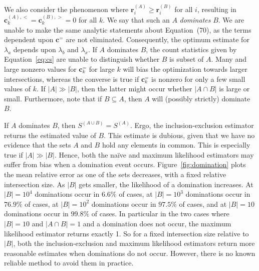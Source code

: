 \documentclass{vldb}
\begin{document}
\begin{appendix}
We also consider the phenomenon where $\mathbf{r}^{(A)}_i \geq \mathbf{r}^{(B)}_i$ for all $i$, resulting in  $\mathbf{c}^{(A),<}_k = \mathbf{c}^{(B),>}_k = 0$ for all $k$. 
We say that such an $A$ \emph{dominates} $B$. 
We are unable to make the same analytic statements about Equation~(70), as the terms dependent upon $\mathbf{c}^{=}$ are not eliminated.
Consequently, the optimum estimate for $\lambda_a$ depends upon $\lambda_b$ and $\lambda_x$. 
If $A$ dominates $B$, the count statistics given by Equation~\ref{eq:cs} are unable to distinguish whether $B$ is subset of $A$. 
Many and large nonzero values for $\mathbf{c}^{=}_k$ for large $k$ will bias the optimization towards larger intersections, whereas the converse is true if $\mathbf{c}^{=}_k$ is nonzero for only a few small values of $k$.
If $|A| \gg |B|$, then the latter might occur whether $|A \cap B|$ is large or small.
Furthermore, note that if $B \subseteq A$, then $A$ will (possibly strictly) dominate $B$. 

If $A$ dominates $B$, then $S^{(A \cup B)} = S^{(A)}$.
Ergo, the inclusion-exclusion estimator returns the estimated value of $B$.
This estimate is dubious, given that we have no evidence that the sets $A$ and $B$ hold any elements in common. 
This is especially true if $|A| \gg |B|$.
Hence, both the na\"ive and maximum likelihood estimators may suffer from bias when a domination event occurs.
Figure~\ref{fig:domination} plots the mean relative error as one of the sets decreases, with a fixed relative intersection size.
As $|B|$ gets smaller, the likelihood of a domination increases. 
At $|B|= 10^4$ dominations occur in $6.6\%$ of cases, at $|B|= 10^3$ dominations occur in $76.9\%$ of cases, at $|B|= 10^2$ dominations occur in $97.5\%$ of cases, and at $|B|= 10$ dominations occur in $99.8\%$ of cases.
In particular in the two cases where $|B|=10$ and $|A \cap B| = 1$ and a domination does not occur, the maximum likelihood estimator returns exactly 1. 
So for a fixed intersection size relative to $|B|$, both the inclusion-exclusion and maximum likelihood estimators return more reasonable estimates when dominations do not occur.
However, there is no known reliable method to avoid them in practice.



\end{appendix}
\end{document}
